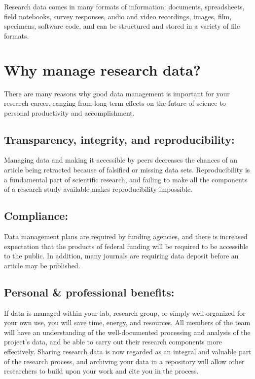 \documentclass[]{article}
\begin{document}
Research data comes in many formats of information: documents,
spreadsheets, field notebooks, survey responses, audio and video
recordings, images, film, specimens, software code, and can be
structured and stored in a variety of file formats.

\section{Why manage research data?}\label{why-manage-research-data}

There are many reasons why good data management is important for your
research career, ranging from long-term effects on the future of science
to personal productivity and accomplishment.

\subsection{Transparency, integrity, and
reproducibility:}\label{transparency-integrity-and-reproducibility}

Managing data and making it accessible by peers decreases the chances of
an article being retracted because of falsified or missing data sets.
Reproducibility is a fundamental part of scientific research, and
failing to make all the components of a research study available makes
reproducibility impossible.

\subsection{Compliance:}\label{compliance}

Data management plans are required by funding agencies, and there is
increased expectation that the products of federal funding will be
required to be accessible to the public. In addition, many journals are
requiring data deposit before an article may be published.

\subsection{Personal \& professional
benefits:}\label{personal-professional-benefits}

If data is managed within your lab, research group, or simply
well-organized for your own use, you will save time, energy, and
resources. All members of the team will have an understanding of the
well-documented processing and analysis of the project's data, and be
able to carry out their research components more effectively. Sharing
research data is now regarded as an integral and valuable part of the
research process, and archiving your data in a repository will allow
other researchers to build upon your work and cite you in the process.
\end{document}
